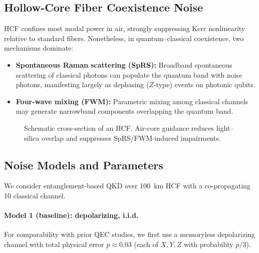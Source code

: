 \subsection{Hollow-Core Fiber Coexistence Noise}
HCF confines most modal power in air, strongly suppressing Kerr nonlinearity relative to standard fibers. Nonetheless, in quantum--classical coexistence, two mechanisms dominate:
\begin{itemize}[leftmargin=*,itemsep=1pt]
  \item \textbf{Spontaneous Raman scattering (SpRS):} Broadband spontaneous scattering of classical photons can populate the quantum band with noise photons, manifesting largely as dephasing (\(Z\)-type) events on photonic qubits.
  \item \textbf{Four-wave mixing (FWM):} Parametric mixing among classical channels may generate narrowband components overlapping the quantum band.
\end{itemize}

\begin{figure}[t]
\centering
{}
\caption{Schematic cross-section of an HCF. Air-core guidance reduces light--silica overlap and suppresses SpRS/FWM-induced impairments.}
\label{fig:hcf}
\end{figure}

\subsection{Noise Models and Parameters}\label{sec:noise_models}
We consider entanglement-based QKD over \SI{100}{\kilo\meter} HCF with a co-propagating \SI{10}{\dBm} classical channel.

\paragraph*{Model 1 (baseline): depolarizing, i.i.d.}
For comparability with prior QEC studies, we first use a memoryless depolarizing channel with total physical error \(p\approx0.03\) (each of \(X,Y,Z\) with probability \(p/3\)).

